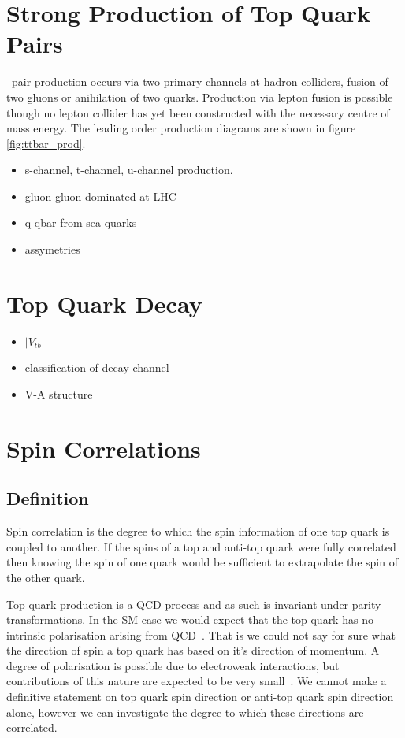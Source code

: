 \section{Strong Production of Top Quark Pairs}
\ttbar\ pair production occurs via two primary channels at hadron colliders, fusion of two gluons or anihilation of two quarks. Production via lepton fusion is possible though no lepton collider has yet been constructed with the necessary centre of mass energy. The leading order production diagrams are shown in figure \ref{fig:ttbar_prod}.

\begin{itemize}
  \item s-channel, t-channel, u-channel production.
  \item gluon gluon dominated at LHC
  \item q qbar from sea quarks
  \item assymetries
\end{itemize}

\section{Top Quark Decay}

\begin{itemize}
  \item $|V_{tb}|$
  \item classification of decay channel
  \item V-A structure
\end{itemize}

\section{Spin Correlations}

\subsection{Definition}
Spin correlation is the degree to which the spin information of one top quark is coupled to another. If the spins of a top and anti-top quark were fully correlated then knowing the spin of one quark would be sufficient to extrapolate the spin of the other quark. 

Top quark production is a QCD process and as such is invariant under parity transformations. In the SM case we would expect that the top quark has no intrinsic polarisation arising from QCD~\cite{NOQCDPOLARISATION}. That is we could not say for sure what the direction of spin a top quark has based on it's direction of momentum. A degree of polarisation is possible due to electroweak interactions, but contributions of this nature are expected to be very small~\cite{EWPOLARISATIONSMALL}. We cannot make a definitive statement on top quark spin direction or anti-top quark spin direction alone, however we can investigate the degree to which these directions are correlated.

